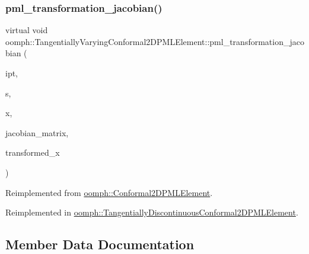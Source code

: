 \subsubsection{\texorpdfstring{pml\+\_\+transformation\+\_\+jacobian()}{pml\_transformation\_jacobian()}\hspace{0.1cm}{\footnotesize\ttfamily [2/2]}}
{\footnotesize\ttfamily virtual void oomph\+::\+Tangentially\+Varying\+Conformal2\+D\+P\+M\+L\+Element\+::pml\+\_\+transformation\+\_\+jacobian (\begin{DoxyParamCaption}\item[{const unsigned \&}]{ipt,  }\item[{const \hyperlink{classoomph_1_1Vector}{Vector}$<$ double $>$ \&}]{s,  }\item[{const \hyperlink{classoomph_1_1Vector}{Vector}$<$ double $>$ \&}]{x,  }\item[{\hyperlink{classoomph_1_1DenseComplexMatrix}{Dense\+Complex\+Matrix} \&}]{jacobian\+\_\+matrix,  }\item[{\hyperlink{classoomph_1_1Vector}{Vector}$<$ std\+::complex$<$ double $>$ $>$ \&}]{transformed\+\_\+x }\end{DoxyParamCaption})\hspace{0.3cm}{\ttfamily [virtual]}}



Reimplemented from \hyperlink{classoomph_1_1Conformal2DPMLElement_a1d352e991b9ad7622c27b82d474b4877}{oomph\+::\+Conformal2\+D\+P\+M\+L\+Element}.



Reimplemented in \hyperlink{classoomph_1_1TangentiallyDiscontinuousConformal2DPMLElement_a2436ebd949ec246a11a7b617a890443e}{oomph\+::\+Tangentially\+Discontinuous\+Conformal2\+D\+P\+M\+L\+Element}.



\subsection{Member Data Documentation}
\mbox{\label{classoomph_1_1TangentiallyVaryingConformal2DPMLElement_a20be46fe19da89f6f2c799509ab38491}} 
